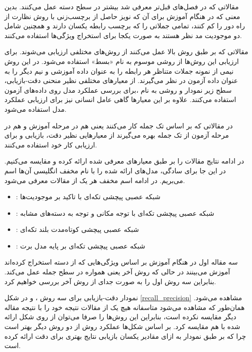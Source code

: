 مقالاتی که در فصل‌های قبل‌تر معرفی شد بیشتر در سطح دسته عمل می‌کنند. بدین معنی که در هنگام آموزش
برای آن که نویز حاصل از برچسب‌زنی با روش نظارت از راه دور را کم کنند، تمامی جملاتی را که برچسب رابطه یکسان دارند
و همچنین شامل دو موجودیت مد نظر هستند به صورت یکجا برای استخراج ویژگی‌ها استفاده می‌کنند.

مقالاتی که بر طبق روش بالا عمل می‌کنند از روش‌های مختلفی ارزیابی می‌شوند. برای ارزیابی این روش‌ها از روشی موسوم به نام
«بسط» استفاده می‌شود. در این روش نیمی از نمونه جملات متناظر
هر رابطه را به عنوان داده آموزشی و نیم دیگر را به عنوان داده آزمون در نظر می‌گیرند. از معیار‌های مختلفی نظیر
منحنی دقت-بازیابی، سطح زیر نمودار
و روشی به نام  ،برای بررسی عملکرد مدل روی داده‌های آزمون استفاده می‌کنند. علاوه بر این معیار‌ها
گاهی عامل انسانی نیز برای ارزیابی عملکرد مدل استفاده می‌شود.

در مقالاتی که بر اساس تک جمله کار می‌کنند یعنی هم در مرحله آموزش و هم در مرحله آزمون از تک جمله
بهره می‌گیرند از معیار‌هایی نظیر دقت، بازیابی
و  برای ارزیابی کار خود استفاده می‌کنند.

در ادامه نتایج مقالات را بر طبق معیار‌های معرفی شده ارائه کرده و مقایسه می‌کنیم.
در این جا برای سادگی، مدل‌های ارائه شده را با نام مخفف انگلیسی آن‌ها اسم می‌بریم.
در ادامه اسم مخفف هر یک از مقالات معرفی می‌شود.

\begin{itemize}
    \item {}: شبکه عصبی پیچشی تکه‌ای با تاکید بر موجودیت‌ها
    \item {}: شبکه عصبی پیچشی تکه‌ای با توجه مکانی و توجه به دسته‌های مشابه
    \item {}: شبکه عصبی پیچشی کوتاه‌مدت بلند تکه‌ای
    \item {}: شبکه عصبی پیچشی تکه‌ای بر پایه مدل برت
\end{itemize}

سه مقاله اول در هنگام آموزش بر اساس ویژگی‌هایی که از دسته استخراج کرده‌اند آموزش می‌بینند
در حالی که روش آخر یعنی همواره  در سطح جمله عمل می‌کند. بنابراین سه روش اول را به صورت جدای
از روش آخر بررسی خواهیم کرد.

نمودار دقت-بازیابی برای سه روش ،  و  در شکل \ref{recall_precision}
مشاهده می‌شود. همان‌طور که مشاهده می‌شود متاسفانه هیچ یک از مقالات نتیجه خود را با نتیجه مقاله دیگر مقایسه نکرده است،
بنابراین این روش‌ها را صرفا می‌توان از روی شکل ارائه شده با هم مقایسه کرد. بر اساس شکل‌ها عملکرد روش 
از دو روش دیگر بهتر است چرا که بر طبق نمودار به ازای مقادیر یکسان بازیابی نتایج بهتری برای دقت ارائه کرده است.

